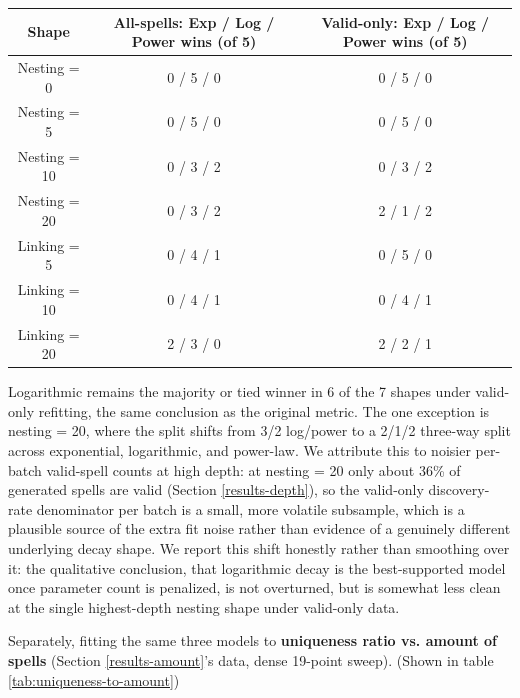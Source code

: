 \documentclass[]{article}
\begin{document}
        \begin{table}[]
            \centering
            \begin{tabularx}{\linewidth}{C C C}
                \hline
                Shape & All-spells: Exp / Log / Power wins (of 5) & Valid-only: Exp / Log / Power wins (of 5) \\
                \hline
                Nesting = 0  & 0 / 5 / 0 & 0 / 5 / 0 \\
                Nesting = 5  & 0 / 5 / 0 & 0 / 5 / 0 \\
                Nesting = 10 & 0 / 3 / 2 & 0 / 3 / 2 \\
                Nesting = 20 & 0 / 3 / 2 & 2 / 1 / 2 \\
                Linking = 5  & 0 / 4 / 1 & 0 / 5 / 0 \\
                Linking = 10 & 0 / 4 / 1 & 0 / 4 / 1 \\
                Linking = 20 & 2 / 3 / 0 & 2 / 2 / 1 \\
                \hline
            \end{tabularx}
            \label{tab:valid-curve-fitting}
        \end{table}
        
        Logarithmic remains the majority or tied winner in 6 of the 7 shapes under valid-only refitting, the same conclusion as the original metric. The one exception is nesting = 20, where the split shifts from 3/2 log/power to a 2/1/2 three-way split across exponential, logarithmic, and power-law. We attribute this to noisier per-batch valid-spell counts at high depth: at nesting = 20 only about 36\% of generated spells are valid (Section \ref{results-depth}), so the valid-only discovery-rate denominator per batch is a small, more volatile subsample, which is a plausible source of the extra fit noise rather than evidence of a genuinely different underlying decay shape. We report this shift honestly rather than smoothing over it: the qualitative conclusion, that logarithmic decay is the best-supported model once parameter count is penalized, is not overturned, but is somewhat less clean at the single highest-depth nesting shape under valid-only data.
        
        Separately, fitting the same three models to \textbf{uniqueness ratio vs. amount of spells} (Section \ref{results-amount}'s data, dense 19-point sweep). (Shown in table \ref{tab:uniqueness-to-amount})
\end{document}
